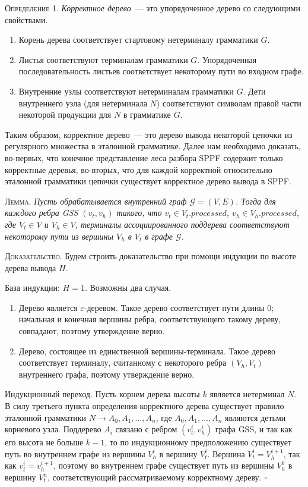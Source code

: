 \textsc{Определение 1.} 
\emph{Корректное дерево}~--- это упорядоченное дерево со следующими свойствами.
\begin{enumerate}
  \item Корень дерева соответствует стартовому нетерминалу грамматики $G$.
  \item Листья соответствуют терминалам грамматики $G$. Упорядоченная последовательность листьев соответствует некоторому пути во входном графе.
  \item Внутренние узлы соответствуют нетерминалам грамматики $G$. Дети внутреннего узла (для нетерминала $N$) соответствуют символам правой части некоторой продукции для $N$ в грамматике $G$.
\end{enumerate}

Таким образом, корректное дерево~--- это дерево вывода некоторой цепочки из регулярного множества в эталонной грамматике. Далее нам необходимо доказать, во-первых, что конечное представление леса разбора SPPF содержит только корректные деревья, во-вторых, что для каждой корректной относительно эталонной грамматики цепочки существует корректное дерево вывода в SPPF. 

\textsc{Лемма.}
\textit{Пусть обрабатывается внутренний граф $\mathcal{G}=(V,E)$. Тогда для каждого ребра GSS $(v_{t}, v_{h})$ такого, что $v_{t} \in V_{t}.processed$, $v_{h} \in V_{h}.processed$, где $V_{t} \in V$ и $V_{h} \in V$, терминалы ассоциированного поддерева соответствуют некоторому пути из вершины $V_{h}$ в $V_{t}$ в графе $\mathcal{G}$.}

\textsc{Доказательство.}
Будем строить доказательство при помощи индукции по высоте дерева вывода $H$. 

База индукции: $H=1$. Возможны два случая.
\begin{enumerate}
  \item Дерево является $\varepsilon$-деревом. Такое дерево соответствует пути длины $0$; начальная и конечная вершины ребра, соответствующего такому дереву, совпадают, поэтому утверждение верно.
  \item Дерево, состоящее из единственной вершины-терминала. Такое дерево соответствует терминалу, считанному с некоторого ребра $(V_{h}, V_{t})$ внутреннего графа, поэтому утверждение верно. 
\end{enumerate}  

Индукционный переход. Пусть корнем дерева высоты $k$ является нетерминал $N$. В силу третьего пункта определения корректного дерева существует правило эталонной грамматики $N \rightarrow A_{0}, A_{1}, \dots, A_{n}$, где $A_{0}, A_{1}, \dots, A_{n}$ являются детьми корневого узла. Поддерево $A_{i}$ связано с ребром $(v_{t}^{i}, v_{h}^{i})$ графа GSS, и так как его высота не больше $k-1$, то по индукционному предположению существует путь во внутреннем графе из вершины $V_{h}^{i}$ в вершину $V_{t}^{i}$. Вершина $V_{t}^{i} = V_{h}^{i+1}$, так как $v_{t}^{i} = v_{h}^{i+1}$, поэтому во внутреннем графе существует путь из вершины $V_{h}^{0}$ в вершину $V_{t}^{n}$, соответствующий рассматриваемому корректному дереву. $\square$

